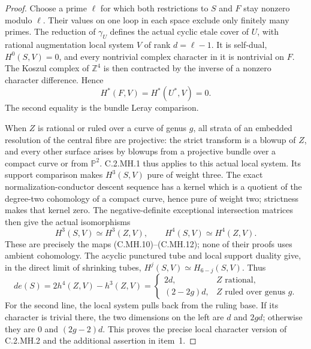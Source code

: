 \begin{proof}
Choose a prime $\ell$ for which both restrictions
to $S$ and $F$ stay nonzero modulo $\ell$.
Their values on one loop in each space exclude
only finitely many primes. The reduction of
$\gamma_U$ defines the actual cyclic etale cover
of $U$, with rational augmentation local system
$V$ of rank $d=\ell-1$. It is self-dual,
$H^0(S,V)=0$, and every nontrivial complex character
in it is nontrivial on $F$. The Koszul complex
of $\mathbb Z^4$ is then contracted by the inverse
of a nonzero character difference. Hence
\[
 H^*(F,V)=H^*(U^*,V)=0.
 \tag{C.UI.9}
\]
The second equality is the bundle Leray comparison.

When $Z$ is rational or ruled over a curve of genus
$g$, all strata of an embedded resolution of the
central fibre are projective: the strict transform
is a blowup of $Z$, and every other surface arises
by blowups from a projective bundle over a compact
curve or from $\mathbb P^2$. C.2.MH.1 thus applies
to this actual local system. Its support comparison
makes $H^3(S,V)$ pure of weight three. The exact
normalization-conductor descent sequence has a
kernel which is a quotient of the degree-two
cohomology of a compact curve, hence pure of weight
two; strictness makes that kernel zero. The
negative-definite exceptional intersection matrices
then give the actual isomorphisms
\[
 H^3(S,V)\simeq H^3(Z,V),\qquad
 H^4(S,V)\simeq H^4(Z,V).
 \tag{C.UI.10}
\]
These are precisely the maps (C.MH.10)--(C.MH.12);
none of their proofs uses ambient cohomology.
The acyclic punctured tube and local support duality
give, in the direct limit of shrinking tubes,
$H^j(S,V)\simeq H_{6-j}(S,V)$. Thus
\[
 d e(S)=2h^4(Z,V)-h^3(Z,V)
 =\begin{cases}
 2d,&Z\text{ rational},\\
 (2-2g)d,&Z\text{ ruled over genus }g.
 \end{cases}
 \tag{C.UI.11}
\]
For the second line, the local system pulls back
from the ruling base. If its character is trivial
there, the two dimensions on the left are $d$
and $2gd$; otherwise they are $0$ and $(2g-2)d$.
This proves the precise local character version
of C.2.MH.2 and the additional assertion in item~1.


\end{proof}
